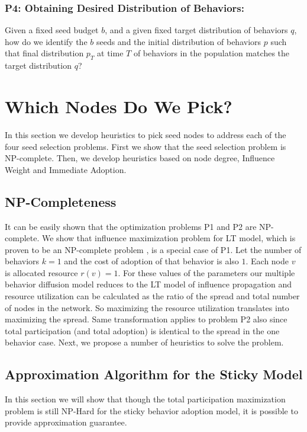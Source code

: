 \documentclass[letterpaper]{article}
\theoremstyle{plain} 		\newtheorem{thm}{Theorem}[section]
\theoremstyle{definition} 	\newtheorem{defn}[thm]{Definition}
\theoremstyle{remark}		\newtheorem{rem}{Remark}
\begin{document}

\subsubsection{P4: Obtaining Desired Distribution of Behaviors:} Given a fixed seed budget $b$, and a given fixed target distribution of behaviors $q$, how do we identify the $b$ seeds and the initial distribution of behaviors $p$ such that final distribution $p_T$ at time $T$ of behaviors in the population matches the target distribution $q$?


\section{Which Nodes Do We Pick?} \label{sec:heuristics}
In this section we develop heuristics to pick seed nodes to address each of the four seed selection problems. First we show that the seed selection problem is NP-complete. Then, we develop heuristics based on node degree, Influence Weight  and Immediate Adoption.

\subsection{NP-Completeness}\label{sec:NP}
It can be easily shown that the optimization problems P1 and P2 are NP-complete. We show that influence maximization problem for LT model, which is proven to be an NP-complete problem \cite{Kempe03}, is a special case of P1. Let the number of behaviors $k=1$ and the cost of adoption of that behavior is also $1$. Each node $v$ is allocated resource $r(v)=1$. For these values of the parameters our multiple behavior diffusion model reduces to the LT model of influence propagation and resource utilization can be calculated as the ratio of the spread and total number of nodes in the network. So maximizing the resource utilization translates into maximizing the spread. Same transformation applies to problem P2 also since total participation (and total adoption) is identical to the spread in the one behavior case. Next, we propose a number of heuristics to solve the problem.

\subsection{Approximation Algorithm for the Sticky Model}
In this section we will show that though the total participation maximization problem is still NP-Hard for the sticky behavior adoption model, it is possible to provide approximation guarantee.
\end{document}
